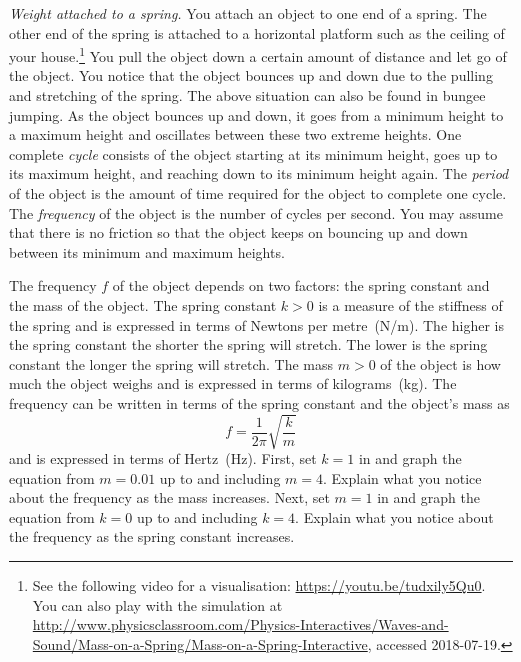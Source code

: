 \documentclass[a4paper,oneside,12pt]{article}
\begin{document}
\begin{problem}
\item\emph{Weight attached to a spring.}
  You attach an object to one end of a spring.  The other end of the
  spring is attached to a horizontal platform such as the ceiling of
  your house.\footnote{
    See the following video for a visualisation:
    \url{https://youtu.be/tudxily5Qu0}.
    You can also play with the simulation at
    \url{http://www.physicsclassroom.com/Physics-Interactives/Waves-and-Sound/Mass-on-a-Spring/Mass-on-a-Spring-Interactive},
    accessed 2018-07-19.
  }
  You pull the object down a certain amount of distance and let go of
  the object.  You notice that the object bounces up and down due to
  the pulling and stretching of the spring.  The above situation can
  also be found in bungee jumping.  As the object bounces up and down,
  it goes from a minimum height to a maximum height and oscillates
  between these two extreme heights.  One complete \emph{cycle}
  consists of the object starting at its minimum height, goes up to
  its maximum height, and reaching down to its minimum height again.
  The \emph{period} of the object is the amount of time required for
  the object to complete one cycle.  The \emph{frequency} of the
  object is the number of cycles per second.  You may assume that
  there is no friction so that the object keeps on bouncing up and
  down between its minimum and maximum heights.
  \begin{packedenum}
  \item\label{subprob:trigonometric:spring_frequency}
    The frequency $f$ of the object depends on two factors: the spring
    constant and the mass of the object.  The spring constant $k > 0$
    is a measure of the stiffness of the spring and is expressed in
    terms of Newtons per metre~(N/m).  The higher is the spring
    constant the shorter the spring will stretch.  The lower is the
    spring constant the longer the spring will stretch.  The mass
    $m > 0$ of the object is how much the object weighs and is
    expressed in terms of kilograms~(kg).  The frequency can be
    written in terms of the spring constant and the object's mass as
    \begin{equation}
    \label{eqn:trigonometric:spring_frequency}
    f
    =
    \frac{1}{2\pi}
    \sqrt{
      \frac{k}{m}
    }
    \end{equation}
    and is expressed in terms of Hertz~(Hz).  First, set $k = 1$ in
     and graph the
    equation from $m = 0.01$ up to and including $m = 4$.  Explain
    what you notice about the frequency as the mass increases.  Next,
    set $m = 1$ in  and
    graph the equation from $k = 0$ up to and including $k = 4$.
    Explain what you notice about the frequency as the spring constant
    increases.


\end{packedenum}
\end{problem}
\end{document}
